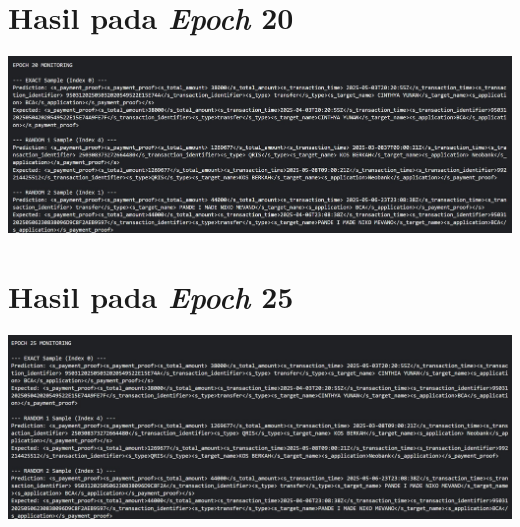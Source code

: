 \section{Hasil pada \emph{Epoch} 20}
\includegraphics[width=1\textwidth]{images/epoch/epoch-20.jpg}

\section{Hasil pada \emph{Epoch} 25}
\includegraphics[width=1\textwidth]{images/epoch/epoch-25.jpg}
